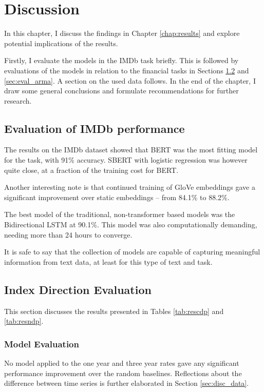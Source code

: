 \chapter{Discussion}

In this chapter, I discuss the findings in Chapter \ref{chap:results} and explore potential implications of the results. 

Firstly, I evaluate the models in the IMDb task briefly. This is followed by evaluations of the models in relation to the financial tasks in Sections \ref{sec:eval_index} and \ref{sec:eval_arma}. A section on the used data follows. In the end of the chapter, I draw some general conclusions and formulate recommendations for further research.

\section{Evaluation of IMDb performance}

The results on the IMDb dataset showed that BERT was the most fitting model for the task, with 91\% accuracy. SBERT with logistic regression was however quite close, at a fraction of the training cost for BERT.

Another interesting note is that continued training of GloVe embeddings gave a significant improvement over static embeddings -- from 84.1\% to 88.2\%. 

The best model of the traditional, non-transformer based models was the Bidirectional LSTM at 90.1\%. This model was also computationally demanding, needing more than 24 hours to converge. 

It is safe to say that the collection of models are capable of capturing meaningful information from text data, at least for this type of text and task. 

\section{Index Direction Evaluation}\label{sec:eval_index}

This section discusses the results presented in Tables \ref{tab:rescdp} and \ref{tab:resndp}.

\subsection{Model Evaluation}

No model applied to the one year and three year rates gave any significant performance improvement over the random baselines. Reflections about the difference between time series is further elaborated in Section \ref{sec:disc_data}. 


